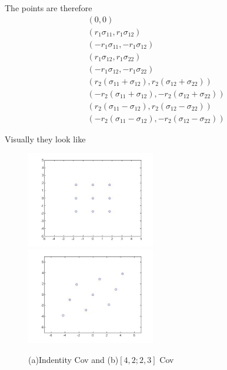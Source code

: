 \documentclass[landscape]{slides}
\begin{document}
\begin{slide}
 The points are therefore
  \begin{align*}
 &(0,0)\\
 &(r_1\sigma_{11},r_1\sigma_{12})\\
 &(-r_1\sigma_{11},-r_1\sigma_{12})\\
 &(r_1\sigma_{12},r_1\sigma_{22})\\
 &(-r_1\sigma_{12},-r_1\sigma_{22})\\
 &(r_2(\sigma_{11}+\sigma_{12}),r_2(\sigma_{12}+\sigma_{22}))\\
 &(-r_2(\sigma_{11}+\sigma_{12}),-r_2(\sigma_{12}+\sigma_{22}))\\
 &(r_2(\sigma_{11}-\sigma_{12}),r_2(\sigma_{12}-\sigma_{22}))\\
 &(-r_2(\sigma_{11}-\sigma_{12}),-r_2(\sigma_{12}-\sigma_{22}))
 \end{align*}
    	\end{slide}
\begin{slide}
 Visually they look like \newline\newline
\begin{figure}
	\includegraphics[width=0.5\textwidth]{eye2quadpts.jpg}
	\includegraphics[width=0.5\textwidth]{P2Dquadpts.jpg}
	\caption{(a)Indentity Cov and (b)$[4,2;2,3]$ Cov}
	\label{fig:eye2quadpts}
\end{figure}
    	\end{slide}
\end{document}
